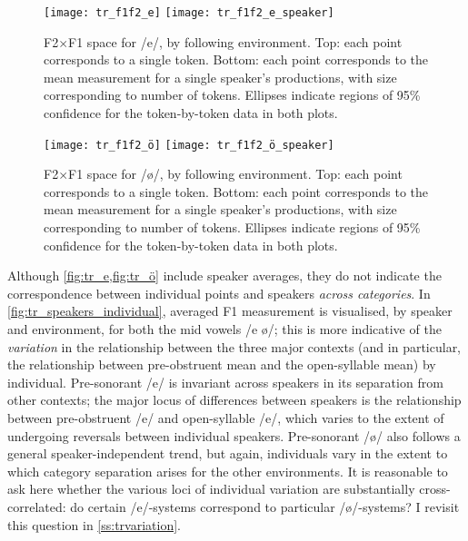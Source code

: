 \begin{figure}[H]
  \centering
  \texttt{[image: tr\_f1f2\_e]}
    \texttt{[image: tr\_f1f2\_e\_speaker]}
  \caption[F2$\times$F1 space for /e/ alone by following environment.]{F2$\times$F1 space for /e/, by following environment. Top: each point corresponds to a single token. Bottom: each point corresponds to the mean measurement for a single speaker's productions, with size corresponding to number of tokens. Ellipses indicate regions of 95\% confidence for the token-by-token data in both plots.}
  \label{fig:tr_e}
\end{figure}

\begin{figure}[H]
  \centering
  \texttt{[image: tr\_f1f2\_ö]}
    \texttt{[image: tr\_f1f2\_ö\_speaker]}
  \caption[F2$\times$F1 space for /\o/ alone by following environment.]{F2$\times$F1 space for /\o/, by following environment. Top: each point corresponds to a single token. Bottom: each point corresponds to the mean measurement for a single speaker's productions, with size corresponding to number of tokens. Ellipses indicate regions of 95\% confidence for the token-by-token data in both plots.}
  \label{fig:tr_ö}
\end{figure}

Although \cref{fig:tr_e,fig:tr_ö} include speaker averages, they do not indicate the correspondence between individual points and speakers \emph{across categories}. In \cref{fig:tr_speakers_individual}, averaged F1 measurement is visualised, by speaker and environment, for both the mid vowels /e ø/; this is more indicative of the \emph{variation} in the relationship between the three major contexts (and in particular, the relationship between pre-obstruent mean and the open-syllable mean) by individual. Pre-sonorant /e/ is invariant across speakers in its separation from other contexts; the major locus of differences between speakers is the relationship between pre-obstruent /e/ and open-syllable /e/, which varies to the extent of undergoing reversals between individual speakers. Pre-sonorant /ø/ also follows a general speaker-independent trend, but again, individuals vary in the extent to which category separation arises for the other environments. It is reasonable to ask here whether the various loci of individual variation are substantially cross-correlated: do certain /e/-systems correspond to particular /ø/-systems? I revisit this question in \cref{ss:trvariation}.

